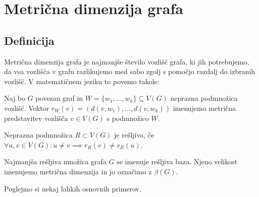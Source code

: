 \documentclass[mat1, tisk]{fmfdelo}
\begin{document}


\section{Metrična dimenzija grafa}


\subsection{Definicija}

Metrična dimenzija grafa je najmanjše število vozlišč grafa, ki jih potrebujemo, da
vsa vozlišča v grafu razlikujemo med sabo zgolj s pomočjo razdalj do izbranih vozlišč.
V matematičnem jeziku to povemo takole:

\begin{definicija} \label{def:1}
    Naj bo $G$ povezan graf in $W = \{ w_1, ... , w_k  \} \subseteq V(G)$ neprazna 
    podmnožica vozlišč. Vektor $r_W(v) = (d(v, w_1), ..., d(v, w_k))$ imenujemo metrična 
    predstavitev vozlišča $v \in V(G)$ s podmnožico $W$.
\end{definicija}

\begin{definicija} \label{def:2}
    Neprazna podmnožica $R \subset V(G)$ je rešljiva,
    če $\forall u, v \in V(G): u \neq v \implies r_R(v) \neq r_R(u)$.
\end{definicija}

\begin{definicija} \label{def:3}
    Najmanjša rešljiva množica grafa $G$ se imenuje rešljiva baza. Njeno velikost imenujemo 
    metrična dimenzija in jo označimo z $\beta(G).$ 
\end{definicija}

Poglejmo si nekaj lahkih osnovnih primerov.
\end{document}
